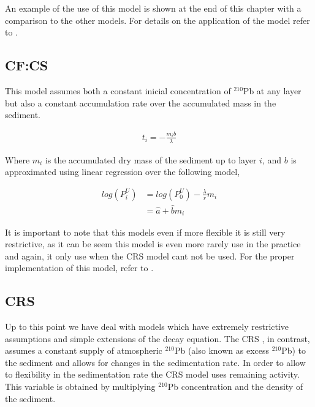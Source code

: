 \documentclass [10pt] {article}
\begin{document}
An example of the use of this model is shown at the end of this chapter with a comparison to the other models. For details on the application of the model refer to \citet{Sanchez-Cabeza2012}.


\subsection{CF:CS}

This model assumes both a constant inicial concentration of $^{210}$Pb at any layer but also a constant accumulation rate over the accumulated mass in the sediment.  

\begin{eqnarray}
	t_i = -\frac{m_i b}{\lambda}
\end{eqnarray}

Where $m_i$ is the accumulated dry mass of the sediment up to layer $i$, and $b$ is approximated using linear regression over the following model,

\begin{eqnarray}
	log(P_i^U) &= log(P_0^U) - \frac{\lambda}{r}m_i \\
		   &= \hat{a} + \hat{b}m_i
\end{eqnarray}

It is important to note that this models even if more flexible it is still very restrictive, as it can be seem this model is even more rarely use in the practice and again, it only use when the CRS model cant not be used. 
For the proper implementation of this model, refer to \citet{Sanchez-Cabeza2012}.


\subsection{CRS}

Up to this point we have deal with models which have extremely restrictive assumptions and simple extensions of the decay equation. 
The CRS \citep{Appleby1998,Appleby2001,Appleby2008}, in contrast, assumes a constant supply of atmospheric $^{210}$Pb (also known as excess $^{210}$Pb) to the sediment and allows for changes in the sedimentation rate. In order to allow to flexibility in the sedimentation rate the CRS model uses remaining activity.
This variable is obtained by multiplying $^{210}$Pb concentration and the density of the sediment.  
\end{document}
